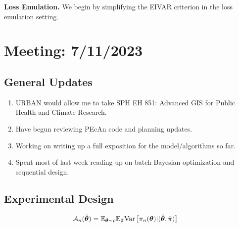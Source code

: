 \documentclass[12pt]{article}
\begin{document}
\noindent
\textbf{Loss Emulation.} 
We begin by simplifying the EIVAR criterion  in the loss emulation setting. 

\section{Meeting: 7/11/2023}

\subsection{General Updates}
\begin{enumerate}
\item URBAN would allow me to take SPH EH 851: Advanced GIS for Public Health and Climate Research. 
\item Have begun reviewing PEcAn code and planning updates. 
\item Working on writing up a full exposition for the model/algorithms so far. 
\item Spent most of last week reading up on batch Bayesian optimization and sequential design. 
\end{enumerate}

\subsection{Experimental Design}
\begin{align*}
\mathcal{A}_{n}(\tilde{\boldsymbol{\theta}}) &= \mathbb{E}_{\boldsymbol{\theta} \sim \rho} \mathbb{E}_{\tilde{\pi}} \mathrm{Var}\left[\pi_{n}(\boldsymbol{\theta}) | (\tilde{\boldsymbol{\theta}}, \tilde{\pi}) \right] 
\end{align*}
\end{document}
